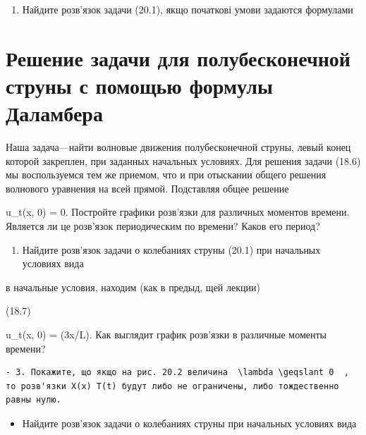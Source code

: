 \documentclass[
  ukrainian,
]{article}
\providecommand{\tightlist}{%
  \setlength{\itemsep}{0pt}\setlength{\parskip}{0pt}}
\begin{document}
\begin{enumerate}
\def\labelenumi{\arabic{enumi}.}
\tightlist
\item
  Найдите розв'язок задачи (20.1), якщо початкові умови задаются
  формулами
\end{enumerate}

\section{Решение задачи для полубесконечной струны с помощью формулы
Даламбера}\label{ux440ux435ux448ux435ux43dux438ux435-ux437ux430ux434ux430ux447ux438-ux434ux43bux44f-ux43fux43eux43bux443ux431ux435ux441ux43aux43eux43dux435ux447ux43dux43eux439-ux441ux442ux440ux443ux43dux44b-ux441-ux43fux43eux43cux43eux449ux44cux44e-ux444ux43eux440ux43cux443ux43bux44b-ux434ux430ux43bux430ux43cux431ux435ux440ux430-1}

Наша задача---найти волновые движения полубесконечной струны, левый
конец которой закреплен, при заданных начальных условиях. Для решения
задачи (18.6) мы воспользуемся тем же приемом, что и при отыскании
общего решения волнового уравнения на всей прямой. Подставляя общее
решение

u\_t(x, 0) = 0. Постройте графики розв'язки для различных моментов
времени. Является ли це розв'язок периодическим по времени? Каков его
период?

\begin{enumerate}
\def\labelenumi{\arabic{enumi}.}
\setcounter{enumi}{1}
\tightlist
\item
  Найдите розв'язок задачи о колебаниях струны (20.1) при начальных
  условиях вида
\end{enumerate}

в начальные условия, находим (как в предыд, щей лекции)

(18.7)

u\_t(x, 0) = \sin(3\pi x/L). Как выглядит график розв'язки в различные
моменты времени?

\begin{verbatim}
- 3. Покажите, що якщо на рис. 20.2 величина  \lambda \geqslant 0  , то розв'язки X(x) T(t) будут либо не ограничены, либо тождественно равны нулю.
\end{verbatim}

\begin{itemize}
\tightlist
\item
  Найдите розв'язок задачи о колебаниях струны при начальных условиях
  вида
\end{itemize}
\end{document}
